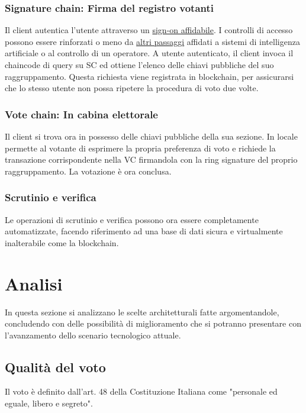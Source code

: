 		\subsubsection{Signature chain: Firma del registro votanti}
			Il client autentica l'utente attraverso un \hyperref[subsec:personalita_voto]{sign-on affidabile}. I controlli di accesso possono essere rinforzati o meno da \hyperref[subsec:liberta_voto]{altri passaggi} affidati a sistemi di intelligenza artificiale o al controllo di un operatore. A utente autenticato, il client invoca il chaincode di query su SC ed ottiene l'elenco delle chiavi pubbliche del suo raggruppamento. Questa richiesta viene registrata in blockchain, per assicurarsi che lo stesso utente non possa ripetere la procedura di voto due volte.
			
		\subsubsection{Vote chain: In cabina elettorale}
			Il client si trova ora in possesso delle chiavi pubbliche della sua sezione. In locale permette al votante di esprimere la propria preferenza di voto e richiede la transazione corrispondente nella VC firmandola con la ring signature del proprio raggruppamento.
			La votazione è ora conclusa.
		
		\subsubsection{Scrutinio e verifica}
			Le operazioni di scrutinio e verifica possono ora essere completamente automatizzate, facendo riferimento ad una base di dati sicura e virtualmente inalterabile come la blockchain.

\section{Analisi}
	In questa sezione si analizzano le scelte architetturali fatte argomentandole, concludendo con delle possibilità di miglioramento che si potranno presentare con l'avanzamento dello scenario tecnologico attuale.
	
	\subsection{Qualità del voto}
		Il voto è definito dall'art. 48 \cite{art48} della Costituzione Italiana come "personale ed eguale, libero e segreto".

